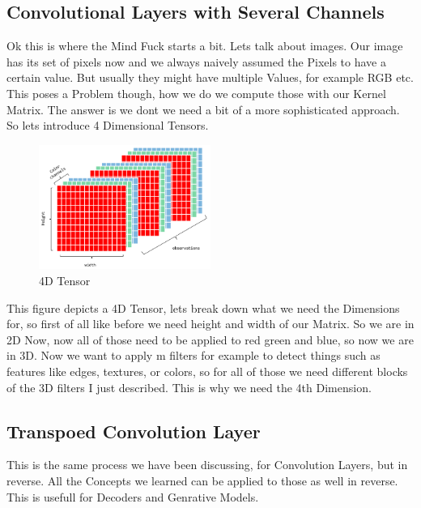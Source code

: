 \documentclass[a4paper]{article}
\begin{document}
\subsection{Convolutional Layers with Several Channels}
Ok this is where the Mind Fuck starts a bit. Lets talk about images. Our image has its set of pixels now and we always naively assumed the Pixels to have a certain value. But usually they might have multiple Values, for example RGB etc. This poses a Problem though, how we do we compute those with our Kernel Matrix. The answer is we dont we need a bit of a more sophisticated approach. 
So lets introduce 4 Dimensional Tensors. 

\begin{figure}
    \centering
    \includegraphics[width=0.5\textwidth]{images/4D_tensor.png}
    \caption{4D Tensor}
    \label{fig:4D Tensor}
\end{figure}
This figure depicts a 4D Tensor, lets break down what we need the Dimensions for, so first of all like before we need height and width of our Matrix. So we are in 2D Now, now all of those need to be applied to red green and blue, so now we are in 3D. Now we want to apply m filters for example to detect things such as  features like edges, textures, or colors, so for all of those we need different blocks of the 3D filters I just described. 
This is why we need the 4th Dimension. 

\subsection{Transpoed Convolution Layer}
This is the same process we have been discussing, for Convolution Layers, but in reverse. All the Concepts we learned can be applied to those as well in reverse. This is usefull for Decoders and Genrative Models.
\end{document}
